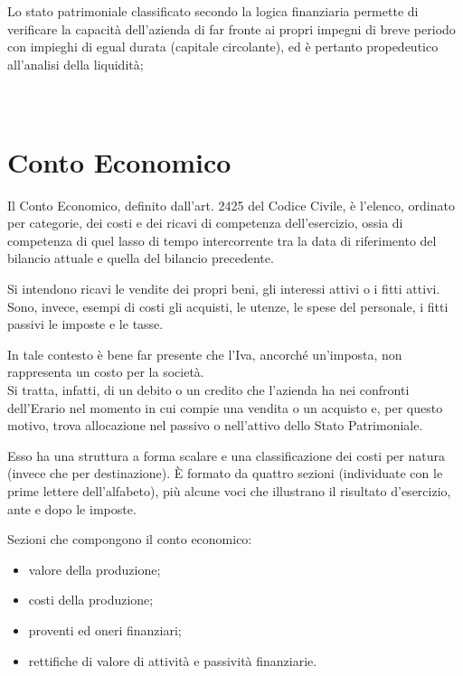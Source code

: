 Lo stato patrimoniale classificato secondo la logica finanziaria permette di verificare la capacità dell’azienda di far fronte ai propri impegni di breve periodo con impieghi di egual durata (capitale circolante), ed è pertanto propedeutico all’analisi della liquidità;
\\
\\
\\


\section{Conto Economico}

Il Conto Economico, definito dall'art. 2425 del Codice Civile, è l'elenco, ordinato per categorie, dei costi e dei ricavi di competenza dell'esercizio, ossia di competenza di quel lasso di tempo intercorrente tra la data di riferimento del bilancio attuale e quella del bilancio precedente.

Si intendono ricavi le vendite dei propri beni, gli interessi attivi o i fitti attivi. 
Sono, invece, esempi di costi gli acquisti, le utenze, le spese del personale, i fitti passivi le imposte e le tasse. 

In tale contesto è bene far presente che l'Iva, ancorché un'imposta, non rappresenta un costo per la società. \\
Si tratta, infatti, di un debito o un credito che l'azienda ha nei confronti dell'Erario nel momento in cui compie una vendita o un acquisto e, per questo motivo, trova allocazione nel passivo o nell'attivo dello Stato Patrimoniale.

Esso ha una struttura a forma scalare e una classificazione dei costi per natura (invece che per destinazione). È formato da quattro sezioni (individuate con le prime lettere dell'alfabeto), più alcune voci che illustrano il risultato d'esercizio, ante e dopo le imposte.

Sezioni che compongono il conto economico:
\begin{itemize}
 \item valore della produzione;
 \item costi della produzione;
 \item proventi ed oneri finanziari;
 \item rettifiche di valore di attività e passività finanziarie.
\end{itemize}

